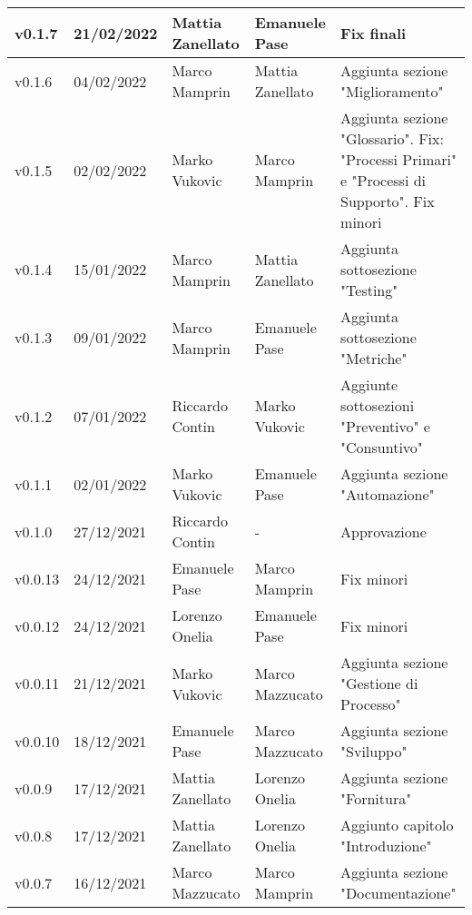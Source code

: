 {\begin{longtable}{|C{1.8cm}|C{2.1cm}|C{2cm}|C{2.4cm}|L{4.4cm}|}
  v0.1.7     & 21/02/2022    & Mattia Zanellato & Emanuele Pase         & Fix finali   \\ \hline
  v0.1.6     & 04/02/2022    & Marco Mamprin    & Mattia Zanellato      & Aggiunta sezione "Miglioramento"   \\ \hline
  v0.1.5     & 02/02/2022    & Marko Vukovic    & Marco Mamprin         & Aggiunta sezione "Glossario". Fix: "Processi Primari" e "Processi di Supporto". Fix minori   \\ \hline
  v0.1.4     & 15/01/2022    & Marco Mamprin    & Mattia Zanellato      & Aggiunta sottosezione "Testing"  \\ \hline
  v0.1.3     & 09/01/2022    & Marco Mamprin    & Emanuele Pase         & Aggiunta sottosezione "Metriche"  \\ \hline
  v0.1.2     & 07/01/2022    & Riccardo Contin  & Marko Vukovic         & Aggiunte sottosezioni "Preventivo" e "Consuntivo"  \\ \hline
  v0.1.1     & 02/01/2022    & Marko Vukovic    & Emanuele Pase         & Aggiunta sezione "Automazione"  \\ \hline
  v0.1.0     & 27/12/2021    & Riccardo Contin  & -                     & Approvazione  \\ \hline
  v0.0.13    & 24/12/2021    & Emanuele Pase    & Marco Mamprin         & Fix minori  \\ \hline
  v0.0.12    & 24/12/2021    & Lorenzo Onelia   & Emanuele Pase         & Fix minori \\ \hline
  v0.0.11    & 21/12/2021    & Marko Vukovic    & Marco Mazzucato       & Aggiunta sezione "Gestione di Processo" \\ \hline
  v0.0.10    & 18/12/2021    & Emanuele Pase    & Marco Mazzucato       & Aggiunta sezione "Sviluppo" \\ \hline
  v0.0.9     & 17/12/2021    & Mattia Zanellato & Lorenzo Onelia        & Aggiunta sezione "Fornitura" \\ \hline
  v0.0.8     & 17/12/2021    & Mattia Zanellato & Lorenzo Onelia        & Aggiunto capitolo "Introduzione" \\ \hline
  v0.0.7     & 16/12/2021    & Marco Mazzucato  & Marco Mamprin         & Aggiunta sezione "Documentazione" \\ \hline

\end{longtable}}
